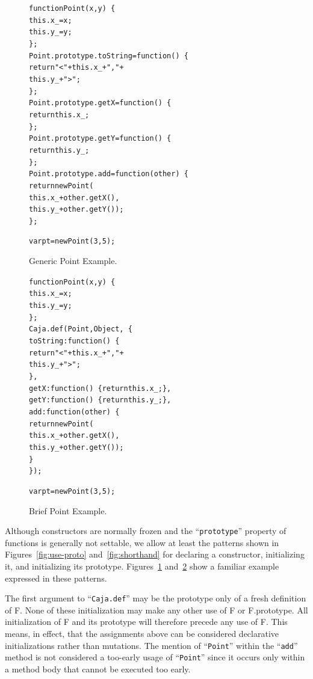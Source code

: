 \documentclass[letterpaper,twocolumn,10pt]{article}
\newcommand{\code}[1]{{\tt {#1}}}              %
\begin{document}
\begin{figure}
\begin{alltt}
function Point(x, y)\ \{
  this.x\_ = x;
  this.y\_ = y;
\};
Point.prototype.toString = function()\ \{ 
  return "<" + this.x\_ + "," + 
               this.y\_ + ">"; 
\};
Point.prototype.getX = function()\ \{ 
  return this.x\_; 
\};
Point.prototype.getY = function()\ \{ 
  return this.y\_; 
\};
Point.prototype.add = function(other)\ \{
  return new Point(
    this.x\_ + other.getX(),
    this.y\_ + other.getY());
\};

var pt = new Point(3, 5);
\end{alltt}
\caption[Generic Point Example.]{Generic Point Example.}
\label{fig:generic-point}
\end{figure}


\begin{figure}
\begin{alltt}
function Point(x, y)\ \{
  this.x\_ = x;
  this.y\_ = y;
\};
Caja.def(Point, Object,\ \{
  toString: function()\ \{ 
    return "<" + this.x\_ + "," + 
                 this.y\_ + ">"; 
  \},
  getX: function()\ \{ return this.x\_; \},
  getY: function()\ \{ return this.y\_; \},
  add: function(other)\ \{
    return new Point(
      this.x\_ + other.getX(),
      this.y\_ + other.getY());
  \}
\});

var pt = new Point(3, 5);
\end{alltt}
\caption[Brief Point Example.]{Brief Point Example.}
\label{fig:brief-point}
\end{figure}

Although constructors are normally frozen and the ``\code{prototype}'' 
property of functions is generally not settable, we allow at least the 
patterns shown in Figures~\ref{fig:use-proto} and~\ref{fig:shorthand} for 
declaring a constructor, initializing it, and initializing its prototype. 
Figures~\ref{fig:generic-point} and~\ref{fig:brief-point} show a familiar 
example expressed in these patterns.

The first argument to ``\code{Caja.def}'' may be the prototype only of a 
fresh definition of F. None of these initialization may make any other use of 
F or F.prototype. All initialization of F and its prototype will therefore 
precede any use of F. This means, in effect, that the assignments above can 
be considered declarative initializations rather than mutations. The mention 
of ``\code{Point}'' within the ``\code{add}'' method is not considered a 
too-early usage of ``\code{Point}'' since it occurs only within a method body 
that cannot be executed too early.
\end{document}
